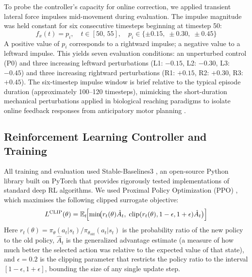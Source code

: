 \documentclass{article}
\begin{document}
To probe the controller's capacity for online correction, we applied
transient lateral force impulses mid-movement during evaluation.
The impulse magnitude was held constant for six consecutive timesteps
beginning at timestep 50:
\begin{equation}
  f_x(t) = p_i, \quad t \in [50,\,55], \quad
  p_i \in \{\pm0.15,\;\pm0.30,\;\pm0.45\}
  \label{eq:perturbation}
\end{equation}
A positive value of $p_i$ corresponds to a rightward impulse; a negative
value to a leftward impulse.
This yields seven evaluation conditions: an unperturbed control (P0) and
three increasing leftward perturbations (L1: $-0.15$, L2: $-0.30$, L3:
$-0.45$) and three increasing rightward perturbations (R1: $+0.15$, R2:
$+0.30$, R3: $+0.45$).
The six-timestep impulse window is brief relative to the typical episode
duration (approximately 100--120 timesteps), mimicking the short-duration
mechanical perturbations applied in biological reaching paradigms to
isolate online feedback responses from anticipatory motor planning
\citep{Pruszynski2012,Nashed2014,Dimitriou2013,Todorov2002,Shadmehr1994}.

\subsection{Reinforcement Learning Controller and Training}

All training and evaluation used Stable-Baselines3
\citep{Raffin2021StableBaselines3}, an open-source Python library built
on PyTorch that provides rigorously tested implementations of standard
deep RL algorithms.
We used Proximal Policy Optimization (PPO) \citep{Schulman2017}, which
maximises the following clipped surrogate objective:
\begin{equation}
  L^{\mathrm{CLIP}}(\theta) = \mathbb{E}_t\!\Bigl[
    \min\!\bigl(r_t(\theta)\hat{A}_t,\;
    \mathrm{clip}(r_t(\theta),1-\epsilon,1+\epsilon)\hat{A}_t\bigr)
  \Bigr]
  \label{eq:ppo}
\end{equation}
Here $r_t(\theta) = \pi_\theta(a_t|s_t) / \pi_{\theta_{\mathrm{old}}}(a_t|s_t)$
is the probability ratio of the new policy to the old policy,
$\hat{A}_t$ is the generalized advantage estimate (a measure of how much
better the selected action was relative to the expected value of that
state), and $\epsilon = 0.2$ is the clipping parameter that restricts
the policy ratio to the interval $[1-\epsilon, 1+\epsilon]$, bounding
the size of any single update step.
\end{document}

